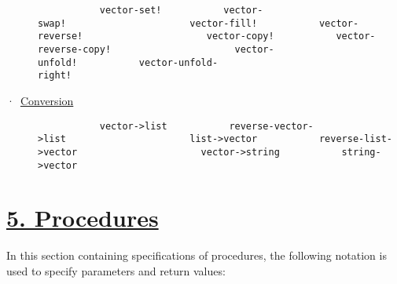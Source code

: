 \begin{description}
\texttt{\ \ \ \ \ \ \ \ \ \ \ vector-set!\ \ \ \ \ \ \ \ \ \ \ vector-swap!\ \ \ \ \ \ \ \ \ \ \ \ \ \ \ \ \ \ \ \ \ \ vector-fill!\ \ \ \ \ \ \ \ \ \ \ vector-reverse!\ \ \ \ \ \ \ \ \ \ \ \ \ \ \ \ \ \ \ \ \ \ vector-copy!\ \ \ \ \ \ \ \ \ \ \ vector-reverse-copy!\ \ \ \ \ \ \ \ \ \ \ \ \ \ \ \ \ \ \ \ \ \ vector-unfold!\ \ \ \ \ \ \ \ \ \ \ vector-unfold-right!\ \ \ \ \ \ \ \ \ \ \ \ \ \ \ \ \ \ \ \ \ \ \ \ \ \ \ \ \ \ \ }
\item[{ ·~\protect\hyperlink{Conversion}{Conversion}\\[2\baselineskip]}]
\texttt{\ \ \ \ \ \ \ \ \ \ \ vector-\textgreater{}list\ \ \ \ \ \ \ \ \ \ \ reverse-vector-\textgreater{}list\ \ \ \ \ \ \ \ \ \ \ \ \ \ \ \ \ \ \ \ \ \ list-\textgreater{}vector\ \ \ \ \ \ \ \ \ \ \ reverse-list-\textgreater{}vector\ \ \ \ \ \ \ \ \ \ \ \ \ \ \ \ \ \ \ \ \ \ vector-\textgreater{}string\ \ \ \ \ \ \ \ \ \ \ string-\textgreater{}vector\ \ \ \ \ \ \ \ \ }
\end{description}

\section{\texorpdfstring{\href{}{5.
Procedures}}{5. Procedures}}\label{procedures}

In this section containing specifications of procedures, the following
notation is used to specify parameters and return values:

